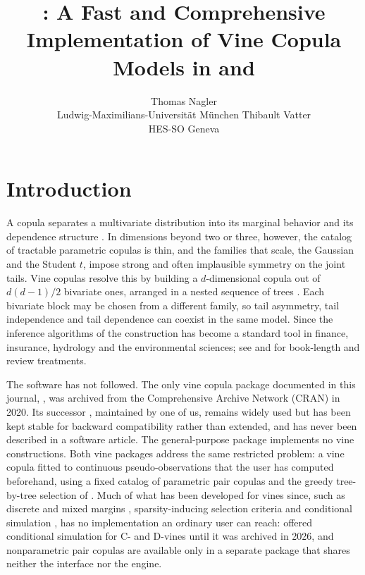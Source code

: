 \documentclass[article]{jss}
\author{Thomas Nagler\\Ludwig-Maximilians-Universit\"at M\"unchen \And
        Thibault Vatter\\HES-SO Geneva}
\title{\pkg{rvinecopulib}: A Fast and Comprehensive Implementation of Vine
       Copula Models in \proglang{C++} and \proglang{R}}
\begin{document}
\section{Introduction}\label{sec:intro}

A copula separates a multivariate distribution into its marginal behavior and
its dependence structure \citep{sklar1959}.  In dimensions beyond two or three,
however, the catalog of tractable parametric copulas is thin, and the
families that scale, the Gaussian and the Student $t$, impose strong and
often implausible symmetry on the joint tails.  Vine copulas resolve this by
building a $d$-dimensional copula out of $d(d-1)/2$ bivariate ones, arranged in
a nested sequence of trees \citep{joe1996,bedford2001,bedford2002}.  Each
bivariate block may be chosen from a different family, so tail asymmetry,
tail independence and tail dependence can coexist in the same model.  Since the
inference algorithms of \citet{aas2009} the construction has become a standard
tool in finance, insurance, hydrology and the environmental sciences; see
\citet{czado2019} and \citet{czado2022} for book-length and review treatments.

The  software has not followed.  The only vine copula package
documented in this journal,  \citep{brechmann2013}, was archived
from the Comprehensive  Archive Network (CRAN) in 2020.  Its
successor  \citep{VineCopula}, maintained by one of us,
remains widely used but has been kept stable for backward compatibility
rather than extended, and has never been described in a software article.
The general-purpose  package \citep{copula} implements no vine
constructions.  Both vine packages address the same restricted problem: a vine
copula fitted to continuous pseudo-observations that the user has computed
beforehand, using a fixed catalog of parametric pair copulas and the greedy
tree-by-tree selection of \citet{dissmann2013}.  Much of what has been
developed for vines since, such as discrete and mixed margins
\citep{panagiotelis2012}, sparsity-inducing selection criteria
\citep{nagler2019} and conditional simulation \citep{cooke2015}, has no
implementation an ordinary  user can reach:
 \citep{CDVineCopulaConditional} offered
conditional simulation for C- and D-vines until it was archived in 2026, and
nonparametric pair copulas \citep{nagler2016} are available only in a
separate package \citep{kdevine} that shares neither the interface nor the
engine.
\end{document}
